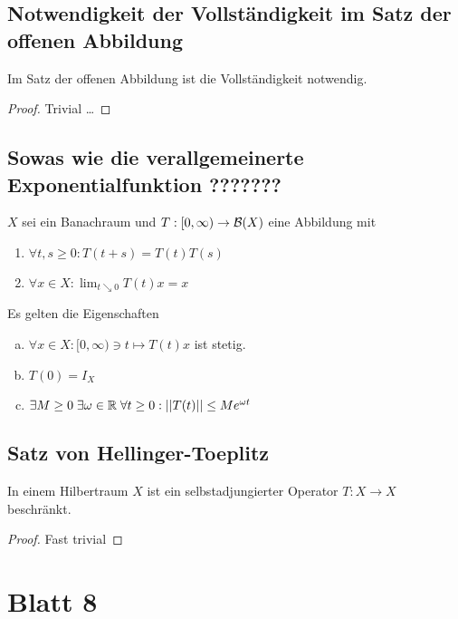 \documentclass[FunkAnaSkript.tex]{subfiles}
\begin{document}
\subsection{ Notwendigkeit der Vollständigkeit im Satz der offenen Abbildung}
\label{B7.3}
	Im Satz der offenen Abbildung ist die Vollständigkeit notwendig.
	
	\begin{proof}
	Trivial \dots
	\end{proof}


\subsection{ Sowas wie die verallgemeinerte Exponentialfunktion ???????}
\label{B7.4}
	$X$ sei ein Banachraum und $T:[0,\infty ) \to \mathcal{B}(X)$ eine Abbildung mit
	\begin{enumerate}
		\item $\forall t,s \geq 0 : T(t+s) = T(t)T(s)$
		\item $\forall x\in X : \lim_{t\searrow 0} T(t)x = x$
	\end{enumerate}
	Es gelten die Eigenschaften
	\begin{enumerate}[(a)]
		\item $\forall x \in X :[0,\infty) \ni t \mapsto T(t)x$ ist stetig.
		\item $T(0) = I_X$
		\item $\exists M \geq 0 \; \exists \omega \in \mathbb{R} \; \forall t \geq 0 : \left\lvert \left\lvert T(t) \right\rvert \right\rvert \leq M e^{\omega t}$
	\end{enumerate}


\subsection{ Satz von Hellinger-Toeplitz}
\label{B7.5}
	In einem Hilbertraum $X$ ist ein selbstadjungierter Operator $T : X\to X$ beschränkt.
	
	\begin{proof}
	Fast trivial
	\end{proof}		
	
	
	
\newpage
\section{ Blatt 8}
\end{document}

